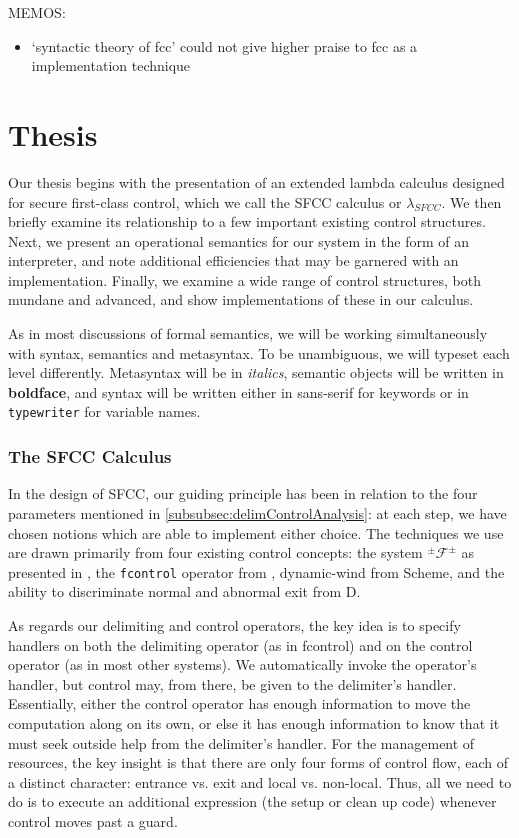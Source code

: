 \documentclass[11pt]{article}
\newcommand{\maybePage}{\newpage}
\newcommand\F{\mathcal{F}}
\newcommand\pmFpm{^\pm\F^\pm}
\begin{document}
MEMOS:
\begin{itemize}
\item `syntactic theory of fcc' could not give higher praise to fcc as a implementation technique
\end{itemize}



\maybePage
\part{Thesis}

Our thesis begins with the presentation of an extended lambda calculus designed for secure first-class control, which we call the SFCC calculus or $\lambda_{SFCC}$.
We then briefly examine its relationship to a few important existing control structures.
Next, we present an operational semantics for our system in the form of an interpreter, and note additional efficiencies that may be garnered with an implementation.
Finally, we examine a wide range of control structures, both mundane and advanced, and show implementations of these in our calculus.

As in most discussions of formal semantics, we will be working simultaneously with syntax, semantics and metasyntax. To be unambiguous, we will typeset each level differently. Metasyntax will be in \textit{italics}, semantic objects will be written in \textbf{boldface}, and syntax will be written either in \textsf{sans-serif} for keywords or in \texttt{typewriter} for variable names.





\maybePage
\section{The SFCC Calculus}
\label{sec:SFCCcalculus}

In the design of SFCC, our guiding principle has been in relation to the four parameters mentioned in \ref{subsubsec:delimControlAnalysis}:
at each step, we have chosen notions which are able to implement either choice.
The techniques we use are drawn primarily from four existing control concepts:
the system $\pmFpm$ as presented in \cite{MFDC}, the \texttt{fcontrol} operator from \cite{HandlingControl}, dynamic-wind from Scheme, and the ability to discriminate normal and abnormal exit from D.

As regards our delimiting and control operators, the key idea is to specify handlers on both the delimiting operator (as in fcontrol) and on the control operator (as in most other systems).
We automatically invoke the operator's handler, but control may, from there, be given to the delimiter's handler.
Essentially, either the control operator has enough information to move the computation along on its own, or else it has enough information to know that it must seek outside help from the delimiter's handler.
For the management of resources, the key insight is that there are only four forms of control flow, each of a distinct character: entrance vs. exit and local vs. non-local.
Thus, all we need to do is to execute an additional expression (the setup or clean up code) whenever control moves past a guard.
\end{document}
